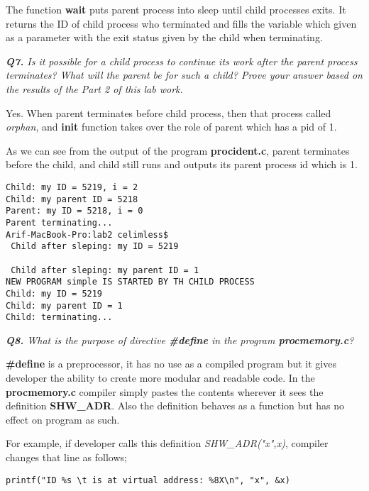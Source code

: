 \documentclass[11pt]{article}
\begin{document}
The function \textbf{wait} puts parent process into sleep until child processes exits. It returns the ID of child process who terminated and fills the variable which given as a parameter with the exit status given by the child when terminating.

\vspace{5mm}
\textit{\textbf{Q7.} Is it possible for a child process to continue its work after the parent process terminates? What will the parent be for such a child? Prove your answer based on the results of the Part 2 of this lab work.}
\vspace{5mm}

Yes. When parent terminates before child process, then that process called \textit{orphan}, and \textbf{init} function takes over the role of parent which has a pid of 1.

As we can see from the output of the program \textbf{procident.c}, parent terminates before the child, and child still runs and outputs its parent process id which is 1.

\begin{lstlisting}[frame=tlrb]
Child: my ID = 5219, i = 2
Child: my parent ID = 5218
Parent: my ID = 5218, i = 0
Parent terminating...
Arif-MacBook-Pro:lab2 celimless$ 
 Child after sleping: my ID = 5219

 Child after sleping: my parent ID = 1
NEW PROGRAM simple IS STARTED BY TH CHILD PROCESS
Child: my ID = 5219
Child: my parent ID = 1
Child: terminating...
\end{lstlisting}


\vspace{5mm}
\textit{\textbf{Q8.} What is the purpose of directive \textbf{\#define} in the program \textbf{procmemory.c}?}
\vspace{5mm}

\textbf{\#define} is a preprocessor, it has no use as a compiled program but it gives developer the ability to create more modular and readable code. In the \textbf{procmemory.c} compiler simply pastes the contents wherever it sees the definition \textbf{SHW\_ADR}. Also the definition behaves as a function but has no effect on program as such.

For example, if developer calls this definition \textit{SHW\_ADR("x",x)}, compiler changes that line as follows; 

\begin{lstlisting}[frame=tlrb]
printf("ID %s \t is at virtual address: %8X\n", "x", &x)
\end{lstlisting}
\end{document}
